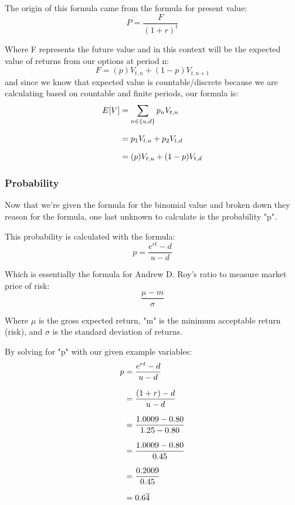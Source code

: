 \documentclass[12pt, letterpaper]{article}
\begin{document}
The origin of this formula came from the formula for present value: %
\begin{equation*}
  P = \frac{F}{(1+r)^t}
\end{equation*}

Where F represents the future value and in this context will be the expected value of returns from our options at period n:
\begin{equation*}
  F = (p)V_{t,n} + (1-p)V_{t,n+1}
\end{equation*}
and since we know that expected value is countable/discrete because we are calculating based on countable and finite periods, our formula is:
\begin{equation*}
  \setlength{\jot}{10pt}
  \begin{split}
    E[V] 
    & = \sum\limits_{n \in \{u,d\}} p_n V_{t,n} \\
    & = p_1 V_{t,u} + p_2 V_{t,d} \\
    & = (p) V_{t,u} + (1-p) V_{t,d} \\
  \end{split}
\end{equation*}

\subsubsection*{Probability}
Now that we're given the formula for the binomial value and broken down they reason for the formula, one last unknown to calculate is the probability "p".

This probability is calculated with the formula:
\begin{equation*}
  p = \frac{e^{rt} - d}{u - d}
\end{equation*}

Which is essentially the formula for Andrew D. Roy's ratio to measure market price of risk:
\begin{equation*}
  \frac{\mu - m}{\sigma}
\end{equation*}

Where $\mu$ is the gross expected return, "m" is the minimum acceptable return (risk), and $\sigma$ is the standard deviation of returns.

By solving for "p" with our given example variables:
\begin{equation*}
  \setlength{\jot}{10pt}
  \begin{split}
    p
    & = \frac{e^{rt} - d}{u - d}
    \\
    & = \frac{(1+r) - d}{u - d}
    \\
    & = \frac{1.0009 - 0.80}{1.25 - 0.80}
    \\
    & = \frac{1.0009 - 0.80}{0.45}
    \\
    & = \frac{0.2009}{0.45}
    \\
    & = 0.6\overline{4}
  \end{split}
\end{equation*}
\end{document}
